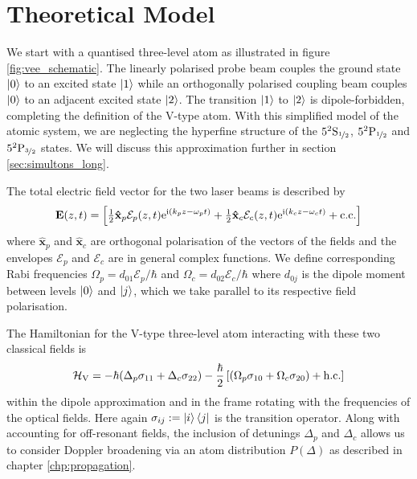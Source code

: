 \section{Theoretical Model}
  \label{sec:simultons_theory}

    We start with a quantised three-level atom as illustrated in figure
    \ref{fig:vee_schematic}. The linearly polarised probe beam couples the
    ground state $\Ket{0}$ to an excited state $\Ket{1}$ while an orthogonally
    polarised coupling beam couples $\Ket{0}$ to an adjacent excited state
    $\Ket{2}$. The transition $\Ket{1}$ to $\Ket{2}$ is dipole-forbidden,
    completing the definition of the V-type atom. With this simplified model of
    the atomic system, we are neglecting the hyperfine structure of the
    $5^2\mathrm{S}_{\nicefrac{1}{2}}$, $5^2\mathrm{P}_{\nicefrac{1}{2}}$ and
    $5^2\mathrm{P}_{\nicefrac{3}{2}}$ states. We will discuss this approximation
    further in section \ref{sec:simultons_long}.

    The total electric field vector for the two laser beams is described by
    \begin{equation}
      \mathbf{E}(z,t) = \left[ \tfrac{1}{2} \mathbf{\hat{x}}_p 
        \mathcal{E}_p(z,t) \mathrm{e}^{\mathrm{i}(k_p z - \omega_p t)} + 
        \tfrac{1}{2} \mathbf{\hat{x}}_c \mathcal{E}_c(z,t) \mathrm{e}^{\mathrm{i}(k_c z -
        \omega_c t)} + \mathrm{c.c.} \right]
      \label{eqn:env_carrier}
    \end{equation}
    where $\mathbf{\hat{x}}_p$ and $\mathbf{\hat{x}}_c$ are orthogonal
    polarisation of the vectors of the fields and the envelopes $\mathcal{E}_p$
    and $\mathcal{E}_c$ are in general complex functions. We define
    corresponding Rabi frequencies $\Omega_p = d_{01}\mathcal{E}_p/\hbar$ and
    $\Omega_c = d_{02}\mathcal{E}_c/\hbar$ where $d_{0j}$ is the dipole moment
    between levels $\Ket{0}$ and $\Ket{j}$, which we take parallel to its
    respective field polarisation.

    The Hamiltonian for the V-type three-level atom interacting with these two 
    classical fields is
    \begin{equation}
      \mathcal{H}_\mathrm{V} = -\hbar (\Delta_p \sigma_{11} + \Delta_c 
      \sigma_{22}) -\frac{\hbar}{2} 
      \left[ (\Omega_p \sigma_{10} + \Omega_c \sigma_{20} )
      + \mathrm{h.c.} \right]
      \label{eqn:vee_hamiltonian}
    \end{equation}
    within the dipole approximation and in the frame rotating with the
    frequencies of the optical fields. Here again $\sigma_{ij} := \Ket{i}\Bra{j}$ is
    the transition operator. Along with accounting for off-resonant fields, the
    inclusion of detunings $\Delta_p$ and $\Delta_c$ allows us to consider
    Doppler broadening via an atom distribution $P(\Delta)$ as described in
    chapter \ref{chp:propagation}.

